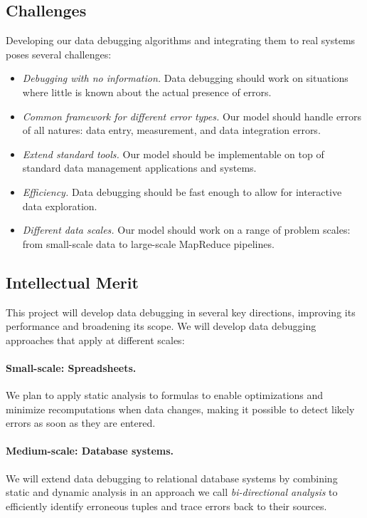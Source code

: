 \subsection{Challenges} %
\label{sub:challenges}
Developing our data debugging algorithms and integrating them to real systems poses several challenges:
\begin{itemize}
	\item \emph{Debugging with no information.} Data debugging should work on situations where little is known about the actual presence of errors.
	\item \emph{Common framework for different error types.} Our model should handle errors of all natures: data entry, measurement, and data integration errors.
	\item \emph{Extend standard tools.} Our model should be implementable on top of standard data management applications and systems.
	\item \emph{Efficiency.} Data debugging should be fast enough to allow for interactive data exploration.
	\item \emph{Different data scales.} Our model should work on a range of problem scales: from small-scale data to large-scale MapReduce pipelines.
\end{itemize}

\subsection{Intellectual Merit}

This project will develop data debugging in several key directions,
improving its performance and broadening its scope. We will develop
data debugging approaches that apply at different scales:

\paragraph{Small-scale: Spreadsheets.} We plan to apply static
analysis to formulas to enable optimizations and minimize
recomputations when data changes, making it possible to detect
likely errors as soon as they are entered.

\paragraph{Medium-scale: Database systems.} We will extend data debugging to
relational database systems by combining static and dynamic analysis
in an approach we call \emph{bi-directional
  analysis} to efficiently identify erroneous tuples and trace errors back to their sources.

